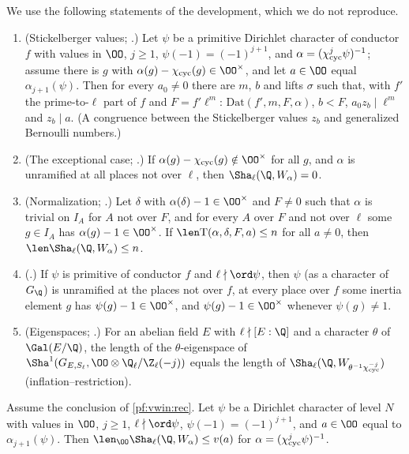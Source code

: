 We use the following statements of the development, which we do not reproduce.
\begin{enumerate}[label=(M\arabic*)]
\item\label{pf:vwin:M-zeval} (Stickelberger values; .) Let $\psi$ be a primitive Dirichlet character of
conductor $f$ with values in $\OO$, $j\ge1$, $\psi(-1)=(-1)^{j+1}$, and $\alpha=(\chi_{\mathrm{cyc}}^j\psi)^{-1}$; assume there is $g$ with
$\alpha(g)-\vwincyc(g)\in\OO^\times$, and let $a\in\OO$ equal $\alpha_{j+1}(\psi)$. Then for every $a_0\ne0$ there are $m$, $b$ and lifts $\sigma$
such that, with $f'$ the prime-to-$\ell$ part of $f$ and $F=f'\ell^m$: $\mathrm{Dat}(f',m,F,\alpha)$, $b<F$, $a_0z_b\mid\ell^m$ and $z_b\mid a$. (A
congruence between the Stickelberger values $z_b$ and generalized Bernoulli numbers.)
\item\label{pf:vwin:M-exc} (The exceptional case; .) If $\alpha(g)-\vwincyc(g)\notin\OO^\times$ for all $g$, and $\alpha$
is unramified at all places not over $\ell$, then $\Sha_\ell(\Q,W_\alpha)=0$.
\item\label{pf:vwin:M-sha} (Normalization; .) Let $\delta$ with $\alpha(\delta)-1\in\OO^\times$ and $F\ne0$ such that
$\alpha$ is trivial on $I_A$ for $A$ not over $F$, and for every $A$ over $F$ and not over $\ell$ some $g\in I_A$ has $\alpha(g)-1\in\OO^\times$. If
$\len\mathrm{T}(\alpha,\delta,F,a)\le n$ for all $a\ne0$, then $\len\Sha_\ell(\Q,W_\alpha)\le n$.
\item\label{pf:vwin:M-prim} (.) If $\psi$ is primitive of conductor $f$ and $\ell\nmid\ord\psi$, then $\psi$ (as a
character of $G_\Q$) is unramified at the places not over $f$, at every place over $f$ some inertia element $g$ has $\psi(g)-1\in\OO^\times$, and
$\psi(g)-1\in\OO^\times$ whenever $\psi(g)\ne1$.
\item\label{pf:vwin:M-eig} (Eigenspaces; .) For an abelian field $E$ with $\ell\nmid[E:\Q]$ and a character $\theta$ of
$\Gal(E/\Q)$, the length of the $\theta$-eigenspace of $\Sha^1(G_{E,S_\ell},\OO\otimes\vwinQZ(-j))$ equals the length of
$\Sha_\ell(\Q,W_{\theta^{-1}\vwincyc^{-j}})$ (inflation--restriction).
\end{enumerate}

\begin{lemma}\label{pf:vwin:vchar}
Assume the conclusion of \cref{pf:vwin:rec}. Let $\psi$ be a Dirichlet character of level $N$ with values in $\OO$, $j\ge1$, $\ell\nmid\ord\psi$,
$\psi(-1)=(-1)^{j+1}$, and $a\in\OO$ equal to $\alpha_{j+1}(\psi)$. Then $\len_\OO\Sha_\ell(\Q,W_\alpha)\le v(a)$ for $\alpha=(\chi_{\mathrm{cyc}}^j\psi)^{-1}$.
\end{lemma}

